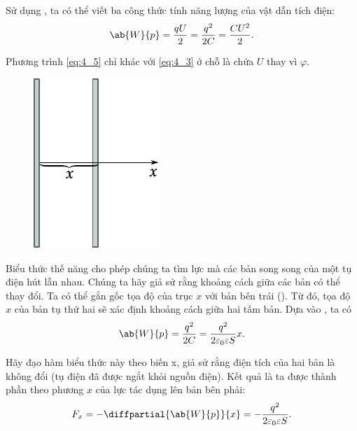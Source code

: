 \noindent
Sử dụng , ta có thể viết ba công thức tính năng lượng của vật dẫn tích điện:
\begin{equation}\label{eq:4_5}
	\ab{W}{p} = \frac{q U}{2} = \frac{q^2}{2 C} = \frac{C U^2}{2}.
\end{equation}

\noindent
Phương trình \eqref{eq:4_5} chỉ khác với \eqref{eq:4_3} ở chỗ là chứa $U$ thay vì $\varphi$.

\begin{figure}[!htb]
	\begin{center}
		\includegraphics[scale=1]{figures/ch_04/fig_4_1.pdf}
		\caption[]{}
		\label{fig:4_1}
	\end{center}
	\vspace{-0.8cm}
\end{figure}

Biểu thức thế năng cho phép chúng ta tìm lực mà các bản song song của một tụ điện hút lẫn nhau. Chúng ta hãy giả sử rằng khoảng cách giữa các bản có thể thay đổi. Ta có thể gắn gốc tọa độ của trục $x$ với bản bên trái (). Từ đó, tọa độ $x$ của bản tụ thứ hai sẽ xác định khoảng cách giữa hai tấm bản. Dựa vào , ta có
\begin{equation*}
	\ab{W}{p} = \frac{q^2}{2 C} = \frac{q^2}{2 \varepsilon_0 \varepsilon S} x.
\end{equation*}

\noindent
Hãy đạo hàm biểu thức này theo biến x, giả sử rằng điện tích của hai bản là không đổi (tụ điện đã được ngắt khỏi nguồn điện). Kết quả là ta được thành phần theo phương $x$ của lực tác dụng lên bản bên phải:
\begin{equation*}
	F_x = - \diffpartial{\ab{W}{p}}{x} = - \frac{q^2}{2 \varepsilon_0 \varepsilon S}.
\end{equation*}

